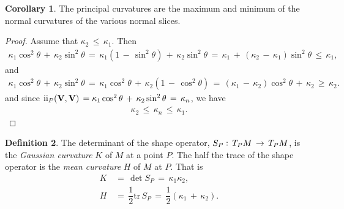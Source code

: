 \documentclass{UKZNcomp}
\newcommand{\vect}[1]{\mathbf{#1}} %
\newcommand{\RN}[1]{%
  \textup{\uppercase\expandafter{\romannumeral#1}}%
}
\theoremstyle{definition}
\newtheorem{definition}{Definition}[section]
\newtheorem{corol}[definition]{Corollary}
\theoremstyle{remark}
\begin{document}
\begin{corol}
The principal curvatures are the maximum and minimum of the normal curvatures of the various normal slices.
\end{corol}

\begin{proof}
Assume that $\kappa_2\,\leq\,\kappa_1$. Then
\begin{align*}
\kappa_1\cos^2\theta\,+\,\kappa_2\sin^2\theta\,=\,\kappa_1(1\,-\,\sin^2\theta)\,+\,\kappa_2\sin^2\theta\,=\,\kappa_1\,+\,(\kappa_2\,-\,\kappa_1)\sin^2\theta\,\leq\,\kappa_1,
\end{align*}
and
\begin{align*}
\kappa_1\cos^2\theta\,+\,\kappa_2\sin^2\theta\,=\,\kappa_1\cos^2\theta\,+\,\kappa_2(1\,-\,\cos^2\theta)\,=\,(\kappa_1\,-\,\kappa_2)\cos^2\theta\,+\,\kappa_2\,\geq\,\kappa_2.
\end{align*}
and since $\RN{2}_P(\vect V,\vect V)\,=\kappa_1\cos^2\theta\,+\,\kappa_2\sin^2\theta\,=\,\kappa_n$, we have
\begin{align*}
\kappa_2\,\leq\,\kappa_n\,\leq\,\kappa_1.
\end{align*}
\end{proof}

\begin{definition}
The determinant of the shape operator, $S_P\vcentcolon\,T_PM\,\to\,T_PM$, is the \textit{Gaussian curvature} $K$ of $M$ at a point $P$. The half the trace of the shape operator is the \textit{mean curvature} $H$ of $M$ at $P$. That is
\begin{align*}
K\,&=\,\det S_P\,=\,\kappa_1\kappa_2,\\
H\,&=\,\dfrac{1}{2}\text{tr}\, S_P\,=\,\dfrac{1}{2}(\kappa_1\,+\,\kappa_2).
\end{align*}
\end{definition}
\end{document}
